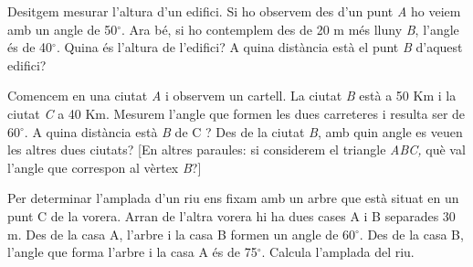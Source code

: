 \begin{mylist}
	
	\exer
	Desitgem mesurar l'altura d'un edifici. Si ho observem des d'un punt
	\emph{A} ho veiem amb un angle de 50${}^\circ$. Ara bé, si ho contemplem des de
	20 m més lluny \emph{B}, l'angle és de 40${}^\circ$. Quina és l'altura de l'edifici? A
	quina distància està el punt \emph{B} d'aquest edifici?
	
	
	\exer
	Comencem en una ciutat \emph{A} i observem un cartell. La ciutat
	\emph{B} està a 50 Km i la ciutat \emph{C} a 40 Km. Mesurem l'angle
	que formen les dues carreteres i resulta ser de 60${}^\circ$. A quina distància
	està \emph{B} de C ? Des de la ciutat \emph{B}, amb quin angle es veuen
	les altres dues ciutats? {[}En altres paraules: si considerem el
	triangle \emph{ABC,} què val l'angle que correspon al vèrtex
	\emph{B}?{]}
	
	
	
	\exer[1] Per determinar l'amplada d'un riu ens fixam amb un 
	arbre que està situat en un punt C de la vorera. Arran de l'altra vorera
	hi ha dues cases A i B separades 30 m. Des de la casa A, l'arbre i la casa B
	formen un angle de 60${}^\circ$. Des de la casa B, l'angle que forma l'arbre i la casa A 
	és de 75${}^\circ$. Calcula l'amplada del riu. 
	

\end{mylist}

